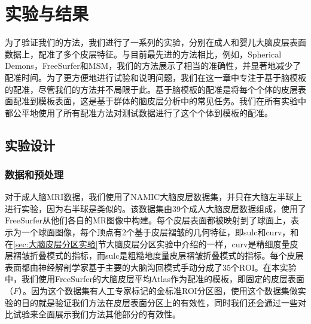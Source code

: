 

\section{实验与结果}
为了验证我们的方法，我们进行了一系列的实验，分别在成人和婴儿大脑皮层表面数据上，配准了多个皮层特征。与目前最先进的方法相比，例如，Spherical Demons\cite{yeo2009spherical}，FreeSurfer\cite{fischl1999high}和MSM\cite{robinson2014msm}，我们的方法展示了相当的准确性，并显著地减少了配准时间。为了更方便地进行试验和说明问题，我们在这一章中专注于基于脑模板的配准，尽管我们的方法并不局限于此。基于脑模板的配准是将每个个体的皮层表面配准到模板表面，这是基于群体的脑皮层分析中的常见任务。我们在所有实验中都公平地使用了所有配准方法对测试数据进行了这个个体到模板的配准。

\subsection{实验设计}
\subsubsection{数据和预处理}\label{sec:S3Reg的数据和预处理}
对于成人脑MRI数据，我们使用了NAMIC大脑皮层数据集\cite{namic}，并只在大脑左半球上进行实验，因为右半球是类似的。该数据集由39个成人大脑皮层数据组成，使用了FreeSurfer\cite{dale1999cortical}从他们各自的MR图像中构建。每个皮层表面都被映射到了球面上，表示为一个球面图像，每个顶点有2个基于皮层褶皱的几何特征，即sulc和curv\cite{fischl2012freesurfer}，和在\ref{sec:大脑皮层分区实验}节大脑皮层分区实验中介绍的一样，curv是精细度量皮层褶皱折叠模式的指标，而sulc是粗糙地度量皮层褶皱折叠模式的指标。每个皮层表面都由神经解剖学家基于主要的大脑沟回模式\cite{desikan2006automated}手动分成了35个ROI。在本实验中，我们使用FreeSurfer的大脑皮层平均Atlas\cite{fischl2012freesurfer}作为配准的模板，即固定的皮层表面（$F$）。因为这个数据集有人工专家标记的金标准ROI分区图，使用这个数据集做实验的目的就是验证我们方法在皮层表面分区上的有效性，同时我们还会通过一些对比试验来全面展示我们方法其他部分的有效性。

